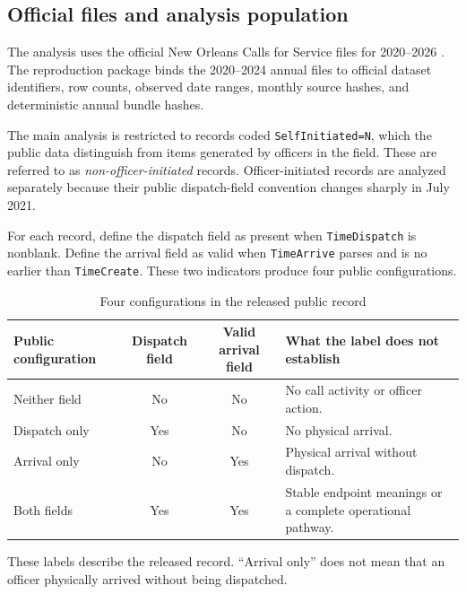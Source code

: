 \documentclass[11pt]{article}
\begin{document}
\subsection{Official files and analysis population}

The analysis uses the official New Orleans Calls for Service files for 2020--2026 \citep{DataNOLA2020,DataNOLA2021,DataNOLA2022,DataNOLA2023,DataNOLA2024,DataNOLA2025,DataNOLA2026}. The reproduction package binds the 2020--2024 annual files to official dataset identifiers, row counts, observed date ranges, monthly source hashes, and deterministic annual bundle hashes.

The main analysis is restricted to records coded \texttt{SelfInitiated=N}, which the public data distinguish from items generated by officers in the field. These are referred to as \emph{non-officer-initiated} records. Officer-initiated records are analyzed separately because their public dispatch-field convention changes sharply in July 2021.

For each record, define the dispatch field as present when \texttt{TimeDispatch} is nonblank. Define the arrival field as valid when \texttt{TimeArrive} parses and is no earlier than \texttt{TimeCreate}. These two indicators produce four public configurations.

\begin{table}[!htbp]
\centering
\caption{Four configurations in the released public record}
\label{tab:states}
\begin{tabularx}{\textwidth}{@{}lccX@{}}
\toprule
Public configuration & Dispatch field & Valid arrival field & What the label does not establish \\
\midrule
Neither field & No & No & No call activity or officer action. \\
Dispatch only & Yes & No & No physical arrival. \\
Arrival only & No & Yes & Physical arrival without dispatch. \\
Both fields & Yes & Yes & Stable endpoint meanings or a complete operational pathway. \\
\bottomrule
\end{tabularx}
\begin{minipage}{0.96\textwidth}\footnotesize
These labels describe the released record. ``Arrival only'' does not mean that an officer physically arrived without being dispatched.
\end{minipage}
\end{table}
\end{document}
